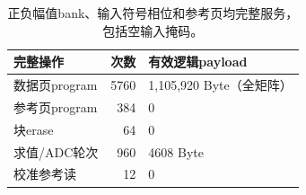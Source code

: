 \begin{table}[htbp]\centering\small
\begin{tabular}{@{}lrl@{}}\toprule
完整操作 & 次数 & 有效逻辑payload\\\midrule
数据页program & 5760 & 1,105,920 Byte（全矩阵）\\
参考页program & 384 & 0\\
块erase & 64 & 0\\
求值/ADC轮次 & 960 & 4608 Byte\\
校准参考读 & 12 & 0\\
\bottomrule\end{tabular}
\caption{正负幅值bank、输入符号相位和参考页均完整服务，包括空输入掩码。}\end{table}
